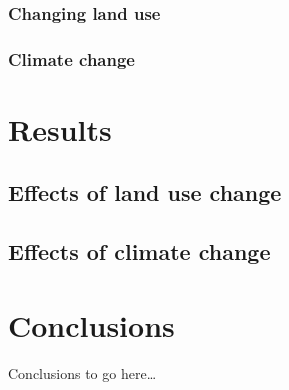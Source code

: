 \documentclass{article}
\begin{document}
\subsubsection{Changing land use}

\subsubsection{Climate change}

\section{Results}

\subsection{Effects of land use change}

\subsection{Effects of climate change}

\section{Conclusions}
Conclusions to go here\ldots

\printbibliography[filter=practical2]
\end{document}
